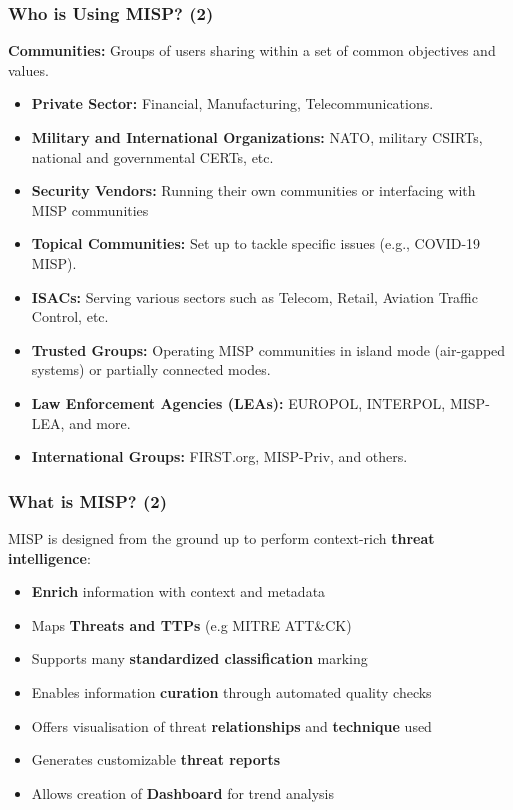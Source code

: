 \begin{frame}
    \frametitle{Who is Using MISP? (2)}
    \textbf{Communities:} Groups of users sharing within a set of common objectives and values.
    \vspace{1em}
    \begin{itemize}
        \item \textbf{Private Sector:} Financial, Manufacturing, Telecommunications.
        \item \textbf{Military and International Organizations:} NATO, military CSIRTs, national and governmental CERTs, etc.
        \item \textbf{Security Vendors:} Running their own communities or interfacing with MISP communities
        \item \textbf{Topical Communities:} Set up to tackle specific issues (e.g., COVID-19 MISP).
        \item \textbf{ISACs:} Serving various sectors such as Telecom, Retail, Aviation Traffic Control, etc.
        \item \textbf{Trusted Groups:} Operating MISP communities in island mode (air-gapped systems) or partially connected modes.
        \item \textbf{Law Enforcement Agencies (LEAs):} EUROPOL, INTERPOL, MISP-LEA, and more.
        \item \textbf{International Groups:} FIRST.org, MISP-Priv, and others.
    \end{itemize}
\end{frame}

\begin{frame}
    \frametitle{What is MISP? (2)}
    MISP is designed from the ground up to perform context-rich \textbf{threat intelligence}:
    \vspace{0.5em}
    \begin{itemize}
           \item {\bf Enrich} information with context and metadata
           \item Maps {\bf Threats and TTPs} (e.g MITRE ATT\&CK)
           \item Supports many {\bf standardized classification} marking
           \item Enables information {\bf curation} through automated quality checks
           \item Offers visualisation of threat {\bf relationships} and \textbf{technique} used
           \item Generates customizable {\bf threat reports}
           \item Allows creation of {\bf Dashboard} for trend analysis
    \end{itemize}
\end{frame}

